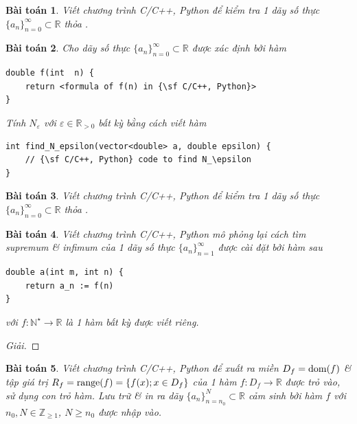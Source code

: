 \documentclass{article}
\newtheorem{baitoan}{Bài toán}
\begin{document}
\begin{baitoan}
	Viết chương trình {\sf C/C++, Python} để kiểm tra 1 dãy số thực $\{a_n\}_{n=0}^\infty\subset\mathbb{R}$ thỏa \cite[Def. 6.1.3]{Tao_analysis_1}.
\end{baitoan}

\begin{baitoan}
	Cho dãy số thực $\{a_n\}_{n=0}^\infty\subset\mathbb{R}$ được xác định bởi hàm
	\begin{verbatim}
double f(int  n) {
    return <formula of f(n) in {\sf C/C++, Python}>
}
	\end{verbatim}
	Tính $N_\varepsilon$ với $\varepsilon\in\mathbb{R}_{>0}$ bất kỳ bằng cách viết hàm
	\begin{verbatim}
int find_N_epsilon(vector<double> a, double epsilon) {
    // {\sf C/C++, Python} code to find N_\epsilon
}
	\end{verbatim}
\end{baitoan}

\begin{baitoan}
	Viết chương trình {\sf C/C++, Python} để kiểm tra 1 dãy số thực $\{a_n\}_{n=0}^\infty\subset\mathbb{R}$ thỏa \cite[Def. 6.1.5]{Tao_analysis_1}.
\end{baitoan}

\begin{baitoan}
	Viết chương trình {\sf C/C++, Python} mô phỏng lại cách tìm supremum \& infimum của 1 dãy số thực $\{a_n\}_{n=1}^\infty$ được cài đặt bởi hàm sau
	\begin{verbatim}
double a(int m, int n) {
    return a_n := f(n)
}
	\end{verbatim}
	với $f:\mathbb{N}^\star\to\mathbb{R}$ là 1 hàm bất kỳ được viết riêng.
\end{baitoan}

\begin{proof}[Giải]
	
\end{proof}

\begin{baitoan}
	Viết chương trình {\sf C/C++, Python} để xuất ra miền $D_f = {\rm dom}(f)$ \& tập giá trị $R_f = {\rm range}(f) = \{f(x);x\in D_f\}$ của 1 hàm $f:D_f\to\mathbb{R}$ được trỏ vào, sử dụng con trỏ hàm. Lưu trữ \& in ra dãy $\{a_n\}_{n = n_0}^N\subset\mathbb{R}$ cảm sinh bởi hàm $f$ với $n_0,N\in\mathbb{Z}_{\ge1}$, $N\ge n_0$ được nhập vào.
\end{baitoan}
\end{document}
